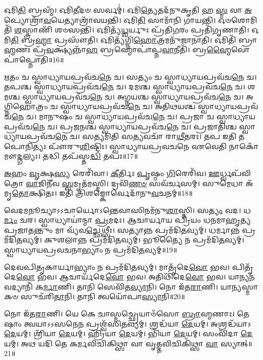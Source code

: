 𑌓𑌮𑌿\-\ul{𑌤𑌿} 𑌬𑍍𑌰𑌹𑍍𑌮᳴। 
𑌓𑌮𑌿\-\ul{𑌤𑍀}\-𑌦𑍞 𑌸𑌰𑍍𑌵𑌮𑍍॑। 
𑌓𑌮𑌿\-\ul{𑌤𑍍𑌯𑍇}\-𑌤𑌦᳴𑌨𑍁𑌕𑍃𑌤𑌿 𑌹 \ul{𑌸𑍍𑌮} 𑌵𑌾 \ul{𑌅}\-𑌪𑍍𑌯𑍋𑌶𑍍𑌰𑌾᳴\-\ul{𑌵}\-𑌯𑍇𑌤𑍍𑌯𑌾𑌶𑍍𑌰𑌾᳴𑌵𑌯𑌨𑍍𑌤𑌿। 
𑌓𑌮𑌿\-\ul{𑌤𑌿} 𑌸𑌾𑌮𑌾᳴𑌨𑌿 𑌗𑌾𑌯𑌨𑍍𑌤𑌿। 
𑌓𑍞\-𑌶𑍋𑌮𑌿𑌤𑌿᳴ \ul{𑌶}\-𑌸𑍍𑌤𑍍𑌰𑌾𑌣𑌿᳴ 𑌶𑍞𑌸𑌨𑍍𑌤𑌿। 
𑌓𑌮𑌿𑌤𑍍𑌯᳴\-\ul{𑌧𑍍𑌵}\-𑌰𑍍𑌯𑍁𑌃 𑌪𑍍𑌰᳴𑌤𑌿\-\ul{𑌗}\-𑌰𑌂 𑌪𑍍𑌰𑌤𑌿᳴\-𑌗𑍃𑌣𑌾𑌤𑌿। 
𑌓𑌮𑌿\-\ul{𑌤𑌿} 𑌬𑍍𑌰\-\ul{𑌹𑍍𑌮𑌾} 𑌪𑍍𑌰𑌸𑍗᳴𑌤𑌿। 
𑌓𑌮𑌿𑌤𑍍𑌯᳴𑌗𑍍𑌨𑌿\-\ul{𑌹𑍋}\-𑌤𑍍𑌰𑌮𑌨𑍁᳴𑌜𑌾𑌨𑌾𑌤𑌿। 
𑌓𑌮𑌿𑌤𑌿᳴ 𑌬𑍍𑌰𑌾\-\ul{𑌹𑍍𑌮}\-𑌣𑌃 𑌪𑍍𑌰᳴\-\ul{𑌵}\-𑌕𑍍𑌷𑍍𑌯𑌨𑍍𑌨𑌾᳴\-\ul{𑌹} 𑌬𑍍𑌰𑌹𑍍𑌮𑍋𑌪𑌾॑𑌪𑍍𑌨\-\ul{𑌵𑌾}\-𑌨𑍀𑌤𑌿᳴। 
𑌬𑍍𑌰\-\ul{𑌹𑍍𑌮𑍈}\-𑌵𑍋\-𑌪𑌾॑𑌪𑍍𑌨𑍋𑌤𑌿॥16॥%
\anuvakamend[𑌓𑌨𑍍𑌦𑌶᳴]

𑌋𑌤𑌂 𑌚 𑌸𑍍𑌵𑌾𑌧𑍍𑌯𑌾𑌯\-𑌪𑍍𑌰𑌵᳴𑌚\-\ul{𑌨𑍇} 𑌚। 
𑌸𑌤𑍍𑌯𑌂 𑌚 𑌸𑍍𑌵𑌾𑌧𑍍𑌯𑌾𑌯\-𑌪𑍍𑌰𑌵᳴𑌚\-\ul{𑌨𑍇} 𑌚। 
𑌤𑌪𑌶𑍍𑌚 𑌸𑍍𑌵𑌾𑌧𑍍𑌯𑌾𑌯\-𑌪𑍍𑌰𑌵᳴𑌚\-\ul{𑌨𑍇} 𑌚। 
𑌦𑌮𑌶𑍍𑌚 𑌸𑍍𑌵𑌾𑌧𑍍𑌯𑌾𑌯\-𑌪𑍍𑌰𑌵᳴𑌚\-\ul{𑌨𑍇} 𑌚। 
𑌶𑌮𑌶𑍍𑌚 𑌸𑍍𑌵𑌾𑌧𑍍𑌯𑌾𑌯\-𑌪𑍍𑌰𑌵᳴𑌚\-\ul{𑌨𑍇} 𑌚। 
𑌅𑌗𑍍𑌨𑌯𑌶𑍍𑌚 𑌸𑍍𑌵𑌾𑌧𑍍𑌯𑌾𑌯\-𑌪𑍍𑌰𑌵᳴𑌚\-\ul{𑌨𑍇} 𑌚। 
𑌅𑌗𑍍𑌨𑌿𑌹𑍋𑌤𑍍𑌰𑌂 𑌚 𑌸𑍍𑌵𑌾𑌧𑍍𑌯𑌾𑌯\-𑌪𑍍𑌰𑌵᳴𑌚\-\ul{𑌨𑍇} 𑌚। 
𑌅𑌤𑌿𑌥𑌯𑌶𑍍𑌚 𑌸𑍍𑌵𑌾𑌧𑍍𑌯𑌾𑌯\-𑌪𑍍𑌰𑌵᳴𑌚\-\ul{𑌨𑍇} 𑌚। 
𑌮𑌾𑌨𑍁𑌷𑌂 𑌚 𑌸𑍍𑌵𑌾𑌧𑍍𑌯𑌾𑌯\-𑌪𑍍𑌰𑌵᳴𑌚\-\ul{𑌨𑍇} 𑌚। 
𑌪𑍍𑌰𑌜𑌾 𑌚 𑌸𑍍𑌵𑌾𑌧𑍍𑌯𑌾𑌯\-𑌪𑍍𑌰𑌵᳴𑌚\-\ul{𑌨𑍇} 𑌚। 
𑌪𑍍𑌰𑌜𑌨𑌶𑍍𑌚 𑌸𑍍𑌵𑌾𑌧𑍍𑌯𑌾𑌯\-𑌪𑍍𑌰𑌵᳴𑌚\-\ul{𑌨𑍇} 𑌚। 
𑌪𑍍𑌰𑌜𑌾𑌤𑌿𑌶𑍍𑌚 𑌸𑍍𑌵𑌾𑌧𑍍𑌯𑌾𑌯\-𑌪𑍍𑌰𑌵᳴𑌚\-\ul{𑌨𑍇} 𑌚। 
𑌸𑌤𑍍𑌯𑌮𑌿𑌤𑌿 𑌸𑌤𑍍𑌯\-𑌵𑌚𑌾᳴ 𑌰𑌾\-\ul{𑌥𑍀}\-𑌤𑌰𑌃। 
𑌤𑌪 𑌇𑌤𑌿 𑌤𑌪𑍋\-𑌨𑌿𑌤𑍍𑌯𑌃 𑌪𑍗᳴𑌰𑍁\-\ul{𑌶𑌿}\-𑌷𑍍𑌟𑌿𑌃। 
𑌸𑍍𑌵𑌾𑌧𑍍𑌯𑌾𑌯\-𑌪𑍍𑌰𑌵𑌚𑌨𑍇 𑌏𑌵𑍇𑌤𑌿 𑌨𑌾𑌕𑍋᳴ 𑌮𑍗\-\ul{𑌦𑍍𑌗}\-𑌲𑍍𑌯𑌃। 
𑌤𑌦𑍍𑌧𑌿 𑌤𑌪᳴𑌸𑍍𑌤\-\ul{𑌦𑍍𑌧𑌿} 𑌤𑌪𑌃॥17॥
\anuvakamend[𑌪𑍍𑌰𑌜𑌾 𑌚 𑌸𑍍𑌵𑌾𑌧𑍍𑌯𑌾𑌯\-𑌪𑍍𑌰𑌵᳴𑌚\-\ul{𑌨𑍇} 𑌚 𑌷𑌟𑍍𑌚᳴]

\-\ul{𑌅}\-𑌹𑌂 \ul{𑌵𑍃}\-𑌕𑍍𑌷\-\ul{𑌸𑍍𑌯} 𑌰𑍇𑌰𑌿᳴𑌵𑌾। 
\-\ul{𑌕𑍀}\-𑌰𑍍𑌤𑌿𑌃 \ul{𑌪𑍃}\-𑌷𑍍𑌠𑌂 \ul{𑌗𑌿}\-𑌰𑍇𑌰𑌿᳴𑌵। 
\-\ul{𑌊}\-𑌰𑍍𑌧𑍍𑌵𑌪᳴𑌵𑌿𑌤𑍍𑌰𑍋 \ul{𑌵𑌾}\-𑌜𑌿𑌨𑍀᳴𑌵 \ul{𑌸𑍍𑌵}\-𑌮𑍃𑌤᳴𑌮𑌸𑍍𑌮𑌿। 
𑌦𑍍𑌰𑌵𑌿᳴\-\ul{𑌣}\-\-\ul{𑍞} 𑌸𑌵᳴𑌰𑍍𑌚𑌸𑌮𑍍। 
𑌸𑍁𑌮𑍇𑌧𑌾 𑌅᳴𑌮𑍃\-\ul{𑌤𑍋}\-𑌕𑍍𑌷𑌿𑌤𑌃। 
𑌇𑌤𑌿 𑌤𑍍𑌰𑌿𑌶𑌙𑍍𑌕𑍋𑌰𑍍𑌵𑍇𑌦𑌾᳴𑌨𑍁\-\ul{𑌵}\-𑌚𑌨𑌮𑍍॥18॥
\anuvakamend[\-\ul{𑌅}\-𑌹𑍞 𑌷𑌟𑍍]

𑌵𑍇𑌦𑌮𑌨𑍂𑌚𑍍𑌯𑌾𑌽𑌽𑌚𑌾𑌰𑍍𑌯𑍋𑌽𑌨𑍍𑌤𑍇𑌵𑌾𑌸𑌿𑌨𑌮᳴𑌨𑍁\-\ul{𑌶𑌾}\-𑌸𑍍𑌤𑌿। 
𑌸\-\ul{𑌤𑍍𑌯𑌂} 𑌵𑌦। 
𑌧\-\ul{𑌰𑍍𑌮𑌂} 𑌚𑌰। 
𑌸𑍍𑌵𑌾𑌧𑍍𑌯𑌾𑌯𑌾॑𑌨𑍍𑌮𑌾 \ul{𑌪𑍍𑌰}\-𑌮𑌦𑌃। 
𑌆𑌚𑌾𑌰𑍍𑌯𑌾𑌯 𑌪𑍍𑌰𑌿𑌯𑌂 𑌧𑌨𑌮𑌾𑌹𑍃𑌤𑍍𑌯 𑌪𑍍𑌰𑌜𑌾𑌤𑌨𑍍𑌤𑍁𑌂 𑌮𑌾 𑌵𑍍𑌯᳴𑌵\-\ul{𑌚𑍍𑌛𑍇}\-𑌥𑍍𑌸𑍀𑌃। 
𑌸𑌤𑍍𑌯𑌾𑌨𑍍𑌨 𑌪𑍍𑌰𑌮᳴𑌦𑌿\-\ul{𑌤}\-𑌵𑍍𑌯𑌮𑍍। 
𑌧𑌰𑍍𑌮𑌾𑌨𑍍𑌨 𑌪𑍍𑌰𑌮᳴𑌦𑌿\-\ul{𑌤}\-𑌵𑍍𑌯𑌮𑍍। 
𑌕𑍁𑌶𑌲𑌾𑌨𑍍𑌨 𑌪𑍍𑌰𑌮᳴𑌦𑌿\-\ul{𑌤}\-𑌵𑍍𑌯𑌮𑍍। 
𑌭𑍂𑌤𑍍𑌯𑍈 𑌨 𑌪𑍍𑌰𑌮᳴𑌦𑌿\-\ul{𑌤}\-𑌵𑍍𑌯𑌮𑍍। 
𑌸𑍍𑌵𑌾𑌧𑍍𑌯𑌾𑌯𑌪𑍍𑌰𑌵𑌚𑌨𑌾𑌭𑍍𑌯𑌾𑌂 𑌨 𑌪𑍍𑌰𑌮᳴𑌦𑌿\-\ul{𑌤}\-𑌵𑍍𑌯𑌮𑍍॥19॥

𑌦𑍇𑌵𑌪𑌿𑌤𑍃𑌕𑌾𑌰𑍍𑌯𑌾𑌭𑍍𑌯𑌾𑌂 𑌨 𑌪𑍍𑌰𑌮᳴𑌦𑌿\-\ul{𑌤}\-𑌵𑍍𑌯𑌮𑍍। 
𑌮𑌾𑌤𑍃᳴𑌦𑍇\-\ul{𑌵𑍋} 𑌭𑌵। 
𑌪𑌿𑌤𑍃᳴𑌦𑍇\-\ul{𑌵𑍋} 𑌭𑌵। 
𑌆𑌚𑌾𑌰𑍍𑌯᳴𑌦𑍇\-\ul{𑌵𑍋} 𑌭𑌵। 
𑌅𑌤𑌿𑌥𑌿᳴𑌦𑍇\-\ul{𑌵𑍋} 𑌭𑌵। 
𑌯𑌾𑌨𑍍𑌯𑌨𑌵𑌦𑍍𑌯𑌾𑌨𑌿᳴ 𑌕\-\ul{𑌰𑍍𑌮𑌾}\-𑌣𑌿। 
𑌤𑌾𑌨𑌿 𑌸𑍇𑌵𑌿᳴𑌤\-\ul{𑌵𑍍𑌯𑌾}\-𑌨𑌿। 
𑌨𑍋 𑌇᳴𑌤\-\ul{𑌰𑌾}\-𑌣𑌿। 
𑌯𑌾𑌨𑍍𑌯𑌸𑍍𑌮𑌾𑌕𑍞 𑌸𑍁𑌚᳴𑌰𑌿\-\ul{𑌤𑌾}\-𑌨𑌿। 
𑌤𑌾𑌨𑌿 𑌤𑍍𑌵𑌯𑍋᳴𑌪𑌾\-\ul{𑌸𑍍𑌯𑌾}\-𑌨𑌿॥20॥

𑌨𑍋 𑌇᳴𑌤\-\ul{𑌰𑌾}\-𑌣𑌿। 
𑌯𑍇 𑌕𑍇 𑌚𑌾𑌸𑍍𑌮𑌚𑍍𑌛𑍍𑌰𑍇𑌯𑌾𑍞᳴𑌸𑍋 \ul{𑌬𑍍𑌰𑌾}\-𑌹𑍍𑌮𑌣𑌾𑌃। 
𑌤𑍇𑌷𑌾𑌂 𑌤𑍍𑌵𑌯𑌾𑌽𑌽𑌸𑌨𑍇𑌨 𑌪𑍍𑌰𑌶𑍍𑌵᳴𑌸𑌿\-\ul{𑌤}\-𑌵𑍍𑌯𑌮𑍍। 
𑌶𑍍𑌰𑌦𑍍𑌧᳴𑌯𑌾 \ul{𑌦𑍇}\-𑌯𑌮𑍍। 
𑌅𑌶𑍍𑌰𑌦𑍍𑌧᳴𑌯𑌾𑌽\-\ul{𑌦𑍇}\-𑌯𑌮𑍍। 
𑌶𑍍𑌰𑌿᳴𑌯𑌾 \ul{𑌦𑍇}\-𑌯𑌮𑍍। 
𑌹𑍍𑌰𑌿᳴𑌯𑌾 \ul{𑌦𑍇}\-𑌯𑌮𑍍। 
𑌭𑌿᳴𑌯𑌾 \ul{𑌦𑍇}\-𑌯𑌮𑍍। 
𑌸𑌂𑌵𑌿᳴𑌦𑌾 \ul{𑌦𑍇}\-𑌯𑌮𑍍। 
𑌅𑌥 𑌯𑌦𑌿 𑌤𑍇 𑌕𑌰𑍍𑌮𑌵𑌿𑌚𑌿𑌕𑌿𑌥𑍍𑌸𑌾 𑌵𑌾 𑌵𑍃𑌤𑍍𑌤𑌵𑌿𑌚𑌿𑌕𑌿᳴𑌥𑍍𑌸𑌾 \ul{𑌵𑌾} 𑌸𑍍𑌯𑌾𑌤𑍍॥21॥

